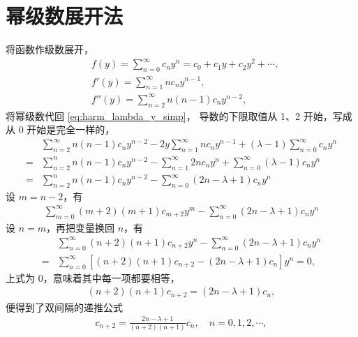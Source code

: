\section{幂级数展开法}
将函数作级数展开，
\begin{align}
    &f(y) = \sum_{n=0}^\infty c_n y^n = c_0 + c_1 y + c_2 y^2 + \cdots,\\
    &f'(y) = \sum_{n=1}^\infty n c_n y^{n-1}, \\
    &f''(y) = \sum_{n=2}^\infty n(n-1) c_n y^{n-2},
\end{align}
将幂级数代回 \eqref{eq:harm_lambda_y_simp}，
导数的下限取值从 1、2 开始，写成从 0 开始是完全一样的，
\begin{align}
    & \sum_{n=2}^{\infty} n(n-1) c_n y^{n-2}-2 y \sum_{n=1}^{\infty} n c_n y^{n-1}+(\lambda-1) \sum_{n=0}^{\infty} c_n y^n \\
    =& \sum_{n=2}^n n(n-1) c_n y^{n-2}-\sum_{n=1}^{\infty} 2 n c_n y^n+\sum_{n=0}^{\infty}(\lambda-1) c_n y^n \\
    =& \sum_{n=2}^n n(n-1) c_n y^{n-2}-\sum_{n=0}^{\infty}(2 n-\lambda+1) c_n y^n
\end{align}
设 $m=n-2$，有
\begin{align}
    \sum_{m=0}^{\infty}(m+2)(m+1) c_{m+2} y^m-\sum_{n=0}^{\infty}(2 n-\lambda+1) c_n y^n
\end{align}
设 $n=m$，再把变量换回 $n$，有
\begin{align}
    &\sum_{n=0}^{\infty}(n+2)(n+1) c_{n+2} y^n-\sum_{n=0}^{\infty}(2 n-\lambda+1) c_n y^n \\
    ={}&\sum_{n=0}^{\infty}\left[(n+2)(n+1) c_{n+2}-(2 n-\lambda+1) c_n\right] y^n = 0, 
\end{align}
上式为 0，意味着其中每一项都要相等，
\begin{align}
    (n+2)(n+1) c_{n+2} = (2n - \lambda + 1)c_n,
\end{align}
便得到了双间隔的递推公式
\begin{align}
    c_{n+2} = \frac{2n - \lambda + 1}{(n+2)(n+1)} c_n, \quad n = 0, 1,2, \cdots,
\end{align}

